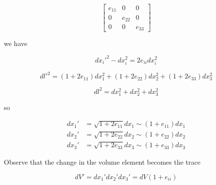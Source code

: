 \begin{equation}\label{eqn:continuumL3:110}
\begin{bmatrix}
e_{11} & 0 & 0 \\
0 & e_{22} & 0 \\
0 & 0 & e_{33} 
\end{bmatrix}
\end{equation}

we have

\begin{equation}\label{eqn:continuumL3:130}
{dx_i'}^2 - dx_i^2 = 2 e_{ii} dx_i^2
\end{equation}

\begin{equation}\label{eqn:continuumL3:150}
{dl'}^2 = 
(1 + 2 e_{11}) dx_1^2
+(1 + 2 e_{22}) dx_2^2
+(1 + 2 e_{33}) dx_3^2
\end{equation}

\begin{equation}\label{eqn:continuumL3:170}
dl^2 = 
dx_1^2
+dx_2^2
+dx_3^2
\end{equation}

so 

\begin{align}\label{eqn:continuumL3:190}
dx_1' &= \sqrt{1 + 2 e_{11}} dx_1 \sim ( 1 + e_{11}) dx_1 \\
dx_2' &= \sqrt{1 + 2 e_{22}} dx_2 \sim ( 1 + e_{22}) dx_2 \\
dx_3' &= \sqrt{1 + 2 e_{33}} dx_3 \sim ( 1 + e_{33}) dx_3
\end{align}

Observe that the change in the volume element becomes the trace

\begin{equation}\label{eqn:continuumL3:210}
dV' = 
dx_1'
dx_2'
dx_3'
= dV(1 + e_{ii})
\end{equation}

